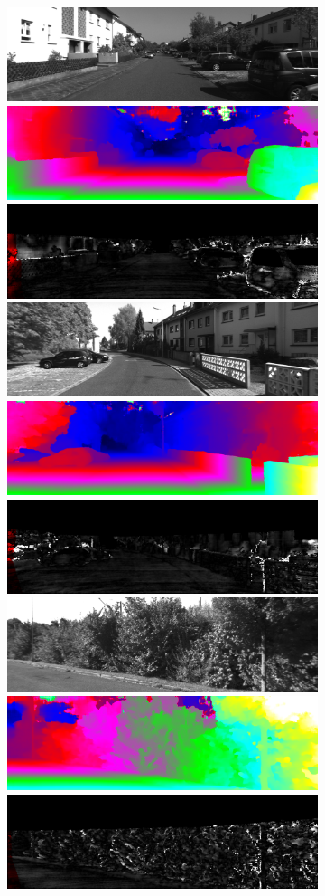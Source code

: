 \begin{figure}[p]
	\begin{center}
    		\begin{subfigure}[t]{\linewidth}
            \centering
			\includegraphics[width=0.31\linewidth]{results_kitti_2012/000000_10.png}
			\includegraphics[width=0.31\linewidth]{results_kitti_2012/000000_10_disp.png}
			\includegraphics[width=0.31\linewidth]{results_kitti_2012/000000_10_error.png}
            \vspace{1 mm}
			\includegraphics[width=0.31\linewidth]{results_kitti_2012/000005_10.png}
			\includegraphics[width=0.31\linewidth]{results_kitti_2012/000005_10_disp.png}
			\includegraphics[width=0.31\linewidth]{results_kitti_2012/000005_10_error.png}
            \vspace{1 mm}
			\includegraphics[width=0.31\linewidth]{results_kitti_2012/000016_10.png}
			\includegraphics[width=0.31\linewidth]{results_kitti_2012/000016_10_disp.png}
			\includegraphics[width=0.31\linewidth]{results_kitti_2012/000016_10_error.png}

\end{subfigure}
\end{center}
\end{figure}
